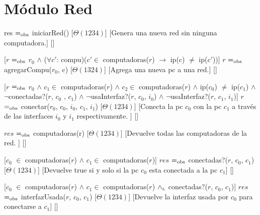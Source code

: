 \section{M\'{o}dulo Red}

\begin{Interfaz}
  

  

  {res $=_{\mathrm{obs}}$ iniciarRed()}%
  [$\Theta(1234)$]%
  [Genera una nueva red sin ninguna computadora.]%
  []%
  
  [$r$ $=_{\mathrm{obs}}$ $r_{0}$ $\land$ ($\forall c'$: compu)($c' \in$ computadoras($r$) $\rightarrow$ ip($c$) $\neq$ ip($c'$))]%
  {$r$ $=_{\mathrm{obs}}$ agregarCompu($r_{0}$, c)}%
  [$\Theta(1324)$]%
  [Agrega una nueva pc a una red.]%
  []%

  [$r$ $=_{\mathrm{obs}}$ $r_{0}$ $\land$ $c_{1} \in$ computadoras($r$) $\land$ $c_{2} \in$ computadoras($r$) $\land$ ip($c_{0} $) $\neq$ ip($c_{1}$) $\land$ $\lnot$conectadas?($r$, $c_{0}$ , $c_{1} $) $\land$ $\lnot$usaInterfaz?($r$, $c_{0}$, $i_{0}$) $\land$ $\lnot$usaInterfaz?($r$, $c_{1}$, $i_{1}$)]%
  {$r$ $=_{\mathrm{obs}}$ conectar($r_{0}$, $c_{0}$, $i_{0}$, $c_{1}$, $i_{1}$)}%
  [$\Theta(1234)$]%
  [Conecta la pc $c_{0}$ con la pc $c_{1}$ a trav\'es de las interfaces $i_{0}$ y $i_{1}$ respectivamente. ]%
  []%
  
  {$res$ $=_{\mathrm{obs}}$ computadoras(r)} %
  [$\Theta(1234)$]%
  [Devuelve todas las computadoras de la red. ]%
  []%
  
  [$c_{0}$ $\in$ computadoras($r$) $\land$ $c_{1} \in $ computadoras($r$)]%
  {$res$ $=_{\mathrm{obs}}$ conectadas?($r$, $c_{0}$, $c_{1}$)}%
  [$\Theta(1234)$]%
  [Devuelve true si y solo si la pc $c_{0}$ esta conectada a la pc $c_{1}$]%
  []%
  
  [$c_{0}$ $\in$ computadoras($r$) $\land$ $c_{1} \in $ computadoras($r$) $\land_{\mathrm{\scriptscriptstyle{L}}}$ conectadas?($r$, $c_{0}$, $c_{1}$)]%
  {$res$ $=_{\mathrm{obs}}$ interfazUsada($r$, $c_{0}$, $c_{1}$)}%
  [$\Theta(1234)$]%
  [Devuelve la interfaz usada por $c_{0}$ para conectarse a $c_{1}$]%
  []%
  

\end{Interfaz}
